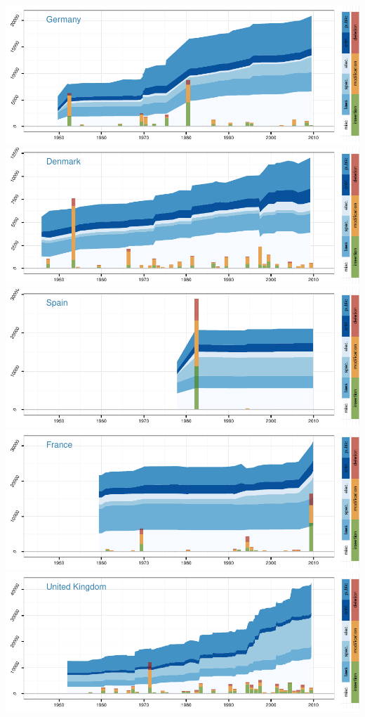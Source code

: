 \documentclass[a4paper]{article}
\begin{document}
\includegraphics{in_progress_files/figure-latex/unnamed-chunk-5-5.pdf}
\includegraphics{in_progress_files/figure-latex/unnamed-chunk-5-6.pdf}
\includegraphics{in_progress_files/figure-latex/unnamed-chunk-5-7.pdf}
\includegraphics{in_progress_files/figure-latex/unnamed-chunk-5-8.pdf}
\includegraphics{in_progress_files/figure-latex/unnamed-chunk-5-9.pdf}
\end{document}
